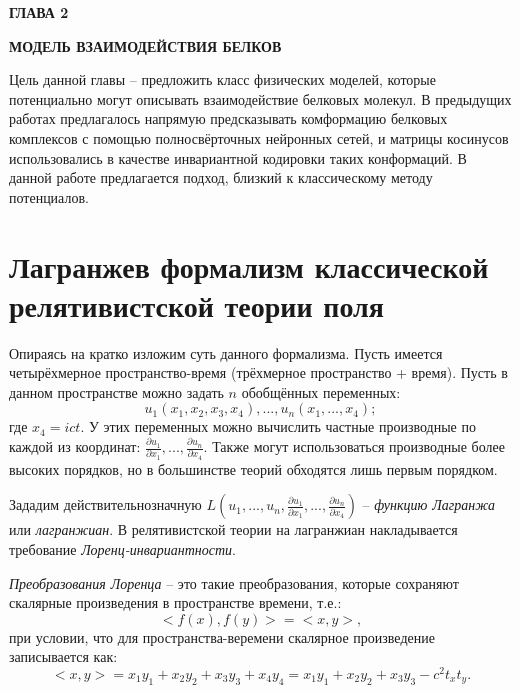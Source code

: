\newpage
\begin{center}
	\textbf{\large ГЛАВА 2}

	\textbf{\large МОДЕЛЬ ВЗАИМОДЕЙСТВИЯ БЕЛКОВ}
\end{center}

Цель данной главы -- предложить класс физических моделей, которые потенциально могут описывать взаимодействие белковых молекул.
В предыдущих работах \cite{prip2023} предлагалось напрямую предсказывать комформацию белковых комплексов с помощью полносвёрточных нейронных сетей,
и матрицы косинусов использовались в качестве инвариантной кодировки таких конформаций. В данной работе предлагается подход, близкий к классическому методу потенциалов.

\section{Лагранжев формализм классической релятивистской теории поля}
Опираясь на \cite{field_theory} кратко изложим суть данного формализма. Пусть имеется четырёхмерное пространство-время (трёхмерное пространство + время).
Пусть в данном пространстве можно задать $n$ обобщённых переменных:
\begin{equation}
	u_1(x_1, x_2, x_3, x_4), ..., u_n(x_1, ..., x_4);
	\label{generalized_variables}
\end{equation}
где $x_4 = ict$. У этих переменных можно вычислить
частные производные по каждой из координат: $\frac{\partial{u_1}}{\partial{x_1}}, ..., \frac{\partial{u_n}}{\partial{x_4}}$. Также могут использоваться производные
более высоких порядков, но в большинстве теорий обходятся лишь первым порядком.

Зададим действительнозначную $L(u_1, ..., u_n, \frac{\partial{u_1}}{\partial{x_1}}, ..., \frac{\partial{u_n}}{\partial{x_4}})$ -- \textit{функцию Лагранжа} или \textit{лагранжиан}.
В релятивистской теории на лагранжиан накладывается требование \textit{Лоренц-инвариантности}.

\textit{Преобразования Лоренца} -- это такие преобразования, которые сохраняют скалярные произведения в пространстве времени, т.е.:
\begin{equation}
	<f(x), f(y)> = <x, y>,
	\label{Lorenz_group}
\end{equation}
при условии, что для пространства-веремени скалярное произведение записывается как:
\begin{equation}
	<x, y> = x_1y_1 + x_2y_2 + x_3y_3 + x_4y_4 = x_1y_1 + x_2y_2 + x_3y_3 - c^2t_xt_y.
	\label{Minkowski_product}
\end{equation}

